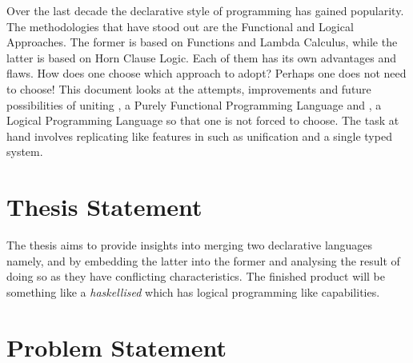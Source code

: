 \documentclass[thesis-solanki.tex]{subfiles}
\begin{document}
Over the last decade the declarative style of programming has gained popularity.
The methodologies that have stood out are the Functional and Logical Approaches.
The former is based on Functions and Lambda Calculus, while the latter is based on Horn Clause Logic.
Each of them has its own advantages and ﬂaws.
How does one choose which approach to adopt?
Perhaps one does not need to choose!
This document looks at the attempts, improvements and future possibilities of uniting , a Purely
Functional Programming Language and , a Logical Programming Language so that one is not forced to
choose. The task at hand involves replicating  like features in  such as unification and a single 
typed system.



\section{Thesis Statement}

The thesis aims to provide insights into merging two declarative languages namely,  and
 by embedding the latter into the former and analysing the result of doing so as they have conflicting
characteristics.
The finished product will be something like a \textit{haskellised}  which has logical programming like
capabilities.


\section{Problem Statement}
\end{document}

